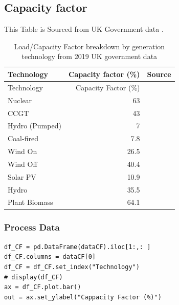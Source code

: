 \documentclass[11pt]{article}
\numberwithin{equation}{section}
\begin{document}
\subsection{Capacity factor \label{secAppCFBreakdown}}
\label{sec:org70b77f7}
This Table is Sourced from UK Government data \cite{NonRE_CF,RenewableElecricityCap}.
\begin{table}[H]
\caption{\label{tabCFBreakdownGov2020}Load/Capacity Factor breakdown by generation technology from 2019 UK government data\cite{DeptEnerLCOE2016,NonRE_CF}}
\centering
\begin{tabular}{lrl}
\toprule
Technology & Capacity factor (\%) & Source\\
\midrule
Technology & Capacity Factor (\%) & \\
Nuclear & 63 & \cite{NonRE_CF}\\
CCGT & 43 & \cite{NonRE_CF}\\
Hydro (Pumped) & 7 & \cite{NonRE_CF}\\
Coal-fired & 7.8 & \cite{RenewableElecricityCap}\\
Wind On & 26.5 & \cite{RenewableElecricityCap}\\
Wind Off & 40.4 & \cite{RenewableElecricityCap}\\
Solar PV & 10.9 & \cite{RenewableElecricityCap}\\
Hydro & 35.5 & \cite{RenewableElecricityCap}\\
Plant Biomass & 64.1 & \cite{RenewableElecricityCap}\\
\bottomrule
\end{tabular}
\end{table}

\subsubsection{Process Data}
\label{sec:org2751d5a}

\begin{verbatim}
df_CF = pd.DataFrame(dataCF).iloc[1:,: ]
df_CF.columns = dataCF[0]
df_CF = df_CF.set_index("Technology")
# display(df_CF)
ax = df_CF.plot.bar()
out = ax.set_ylabel("Cappacity Factor (%)")
\end{verbatim}
\end{document}
